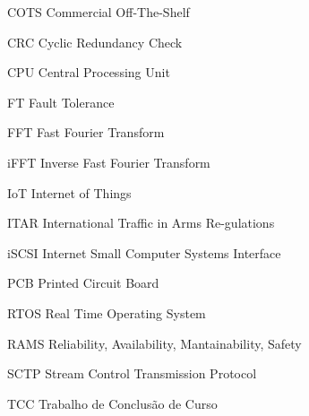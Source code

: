 \listoffigures*
\cleardoublepage


\listofquadros*
\cleardoublepage
\listofequacao*
\cleardoublepage

\begin{siglas}
    \item[COTS]  Commercial Off-The-Shelf
    \item[CRC]   Cyclic Redundancy Check
    \item[CPU]   Central Processing Unit
    \item[FT]    Fault Tolerance
    \item[FFT]   Fast Fourier Transform
    \item[iFFT]  Inverse Fast Fourier Transform
    \item[IoT]   Internet of Things
    \item[ITAR]  International Traffic in Arms Re-gulations
    \item[iSCSI] Internet Small Computer Systems Interface
    \item[PCB]   Printed Circuit Board
    \item[RTOS]  Real Time Operating System
    \item[RAMS]  Reliability, Availability, Mantainability, Safety
    \item[SCTP]  Stream Control Transmission Protocol
    \item[TCC]   Trabalho de Conclusão de Curso
\end{siglas}


\tableofcontents*
\cleardoublepage
